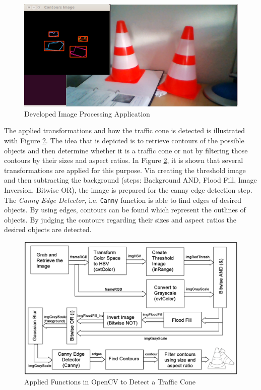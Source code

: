\begin{figure}[!ht]
	\centering
	\captionsetup{justification=centering}
	\includegraphics[scale=0.15]{content/images/traffic_cone_detection.png}
	\caption{Developed Image Processing Application}
	\label{fig:traffic_cone_detection}
\end{figure}

The applied transformations and how the traffic cone is detected is illustrated with Figure \ref{fig:imageproc}. The idea that is depicted is to retrieve contours of the possible objects and then determine whether it is a traffic cone or not by filtering those contours by their sizes and aspect ratios. In Figure \ref{fig:imageproc}, it is shown that several transformations are applied for this purpose. Via creating the threshold image and then subtracting the background (steps: Background AND, Flood Fill, Image Inversion, Bitwise OR), the image is prepared for the canny edge detection step. The \textit{Canny Edge Detector}, i.e. \texttt{Canny} function is able to find edges of desired objects. By using edges, contours can be found which represent the outlines of objects. By judging the contours regarding their sizes and aspect ratios the desired objects are detected.

\begin{figure}[!ht]
	\centering
	\captionsetup{justification=centering}
	\includegraphics[width=\textwidth]{content/images/imageproc.png}
	\caption{Applied Functions in OpenCV to Detect a Traffic Cone}
	\label{fig:imageproc}
\end{figure}

